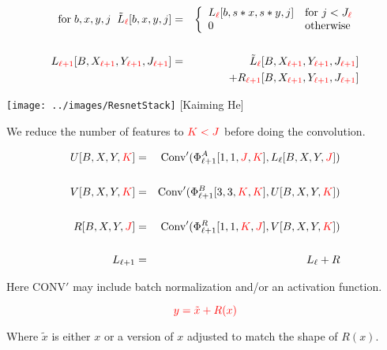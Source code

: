 {\begin{eqnarray*}
\mathrm{for}\;b,x,y,j\;\;\tilde{L}_{\color{red} \ell}[b,x,y,j] & = & \left\{\begin{array}{ll} L_{\color{red} \ell}[b,s*x,s*y,j] & \mbox{for $j < J_{\color{red} \ell}$} \\ 0 & \mbox{otherwise} \end{array}\right.\\
\\
L_{\color{red} \ell+1}[B,X_{\color{red} \ell +1},Y_{\color{red} \ell+1},J_{\color{red}\ell +1}] & = & \tilde{L}_{\color{red} \ell}[B,X_{\color{red} \ell +1},Y_{\color{red} \ell+1},J_{\color{red}\ell +1}] \\
& & + R_{\color{red} \ell+1}[B,X_{\color{red} \ell +1},Y_{\color{red} \ell+1},J_{\color{red}\ell +1}]
\end{eqnarray*}


\centerline{\texttt{[image: ../images/ResnetStack]} {\large [Kaiming He]}}


We reduce the number of features to ${\color{red} K < J}$ before doing the convolution.

{\huge
\begin{eqnarray*}
U[B,X,Y,{\color{red} K}] & = & \mathrm{Conv}'(\Phi^A_{\ell+1}{ [1,1,{\color{red} J},{\color{red} K}]},L_\ell[B,X,Y,{\color{red} J}]) \\
\\
V[B,X,Y,{\color{red} K}] & = & \mathrm{Conv}'(\Phi^B_{\ell+1}{[3,3,{\color{red} K},{\color{red} K}]},U[B,X,Y,{\color{red} K}]) \\
\\
R[B,X,Y,{\color{red} J}] & = & \mathrm{Conv}'(\Phi^R_{\ell+1}{ [1,1,{\color{red} K},{\color{red} J}]},V[B,X,Y,{\color{red} K}]) \\
\\
L_{ \ell+1} & = & L_\ell + R
\end{eqnarray*}
}

\vfill
Here $\mathrm{CONV}'$ may include batch normalization and/or an activation function.


$${\color{red} y = \tilde{x} + R(x)}$$

\vfill
Where $\tilde{x}$ is either $x$ or a version of $x$ adjusted to match the shape of $R(x)$.


}
